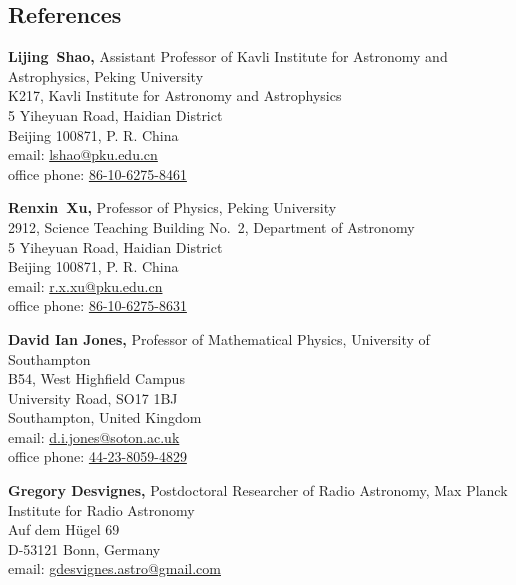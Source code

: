 \documentclass[margin,line]{res}
\begin{document}
\begin{resume}
\section{\sc References}
\vspace*{.05in}
\parbox{\textwidth}{%
{\bf Lijing~Shao,} Assistant Professor of Kavli Institute for Astronomy and Astrophysics, Peking University \\
K217, Kavli Institute for Astronomy and Astrophysics  \\
5 Yiheyuan Road, Haidian District \\
Beijing 100871, P. R. China \\
email: \href{mailto:lshao@pku.edu.cn}{lshao@pku.edu.cn} \\
office phone: \href{tel: 86-10-6275-8461}{ 86-10-6275-8461}}
\par
\parbox{\textwidth}{%
{\bf Renxin~Xu,} Professor of Physics, Peking University\\
2912, Science Teaching Building No.~2, Department of Astronomy\\
5 Yiheyuan Road, Haidian District \\
Beijing 100871, P. R. China \\
email: \href{mailto:r.x.xu@pku.edu.cn}{r.x.xu@pku.edu.cn} \\
office phone: \href{tel:86-10-6275-8631}{86-10-6275-8631}}
\par
\parbox{\textwidth}{%
{\bf David Ian Jones,} Professor of Mathematical Physics, University of Southampton\\
B54, West Highfield Campus\\
University Road, SO17 1BJ\\
Southampton, United Kingdom \\
email: \href{mailto:d.i.jones@soton.ac.uk}{d.i.jones@soton.ac.uk} \\
office phone: \href{tel:44-23-8059-4829}{44-23-8059-4829}}
\par
\parbox{\textwidth}{%
{\bf Gregory Desvignes,} Postdoctoral Researcher of Radio Astronomy, Max Planck Institute for Radio Astronomy\\
Auf dem Hügel 69\\
D-53121 Bonn, Germany\\
email: \href{mailto:gdesvignes.astro@gmail.com}{gdesvignes.astro@gmail.com}}

\end{resume}
\end{document}
